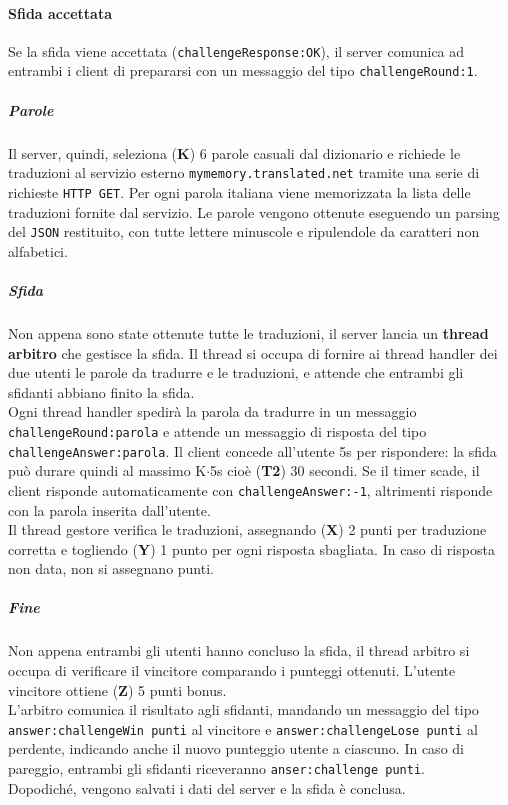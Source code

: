 \documentclass[10pt]{article}
\begin{document}
{\paragraph{Sfida accettata} Se la sfida viene accettata (\texttt{challengeResponse:OK}), il server comunica ad entrambi i client di prepararsi con un messaggio del tipo \texttt{challengeRound:1}.
\subparagraph{Parole} Il server, quindi, seleziona (\textbf{K}) 6 parole casuali dal dizionario e richiede le traduzioni al servizio esterno \texttt{mymemory.translated.net} tramite una serie di richieste \texttt{HTTP GET}. Per ogni parola italiana viene memorizzata la lista delle traduzioni fornite dal servizio. Le parole vengono ottenute eseguendo un parsing del \texttt{JSON} restituito, con tutte lettere minuscole e ripulendole da caratteri non alfabetici.
\subparagraph{Sfida} Non appena sono state ottenute tutte le traduzioni, il server lancia un \textbf{thread arbitro} che gestisce la sfida. Il thread si occupa di fornire ai thread handler dei due utenti le parole da tradurre e le traduzioni, e attende che entrambi gli sfidanti abbiano finito la sfida.\\
Ogni thread handler spedirà la parola da tradurre in un messaggio \texttt{challengeRound:parola} e attende un messaggio di risposta del tipo \texttt{challengeAnswer:parola}. Il client concede all'utente 5s per rispondere: la sfida può durare quindi al massimo K$\cdot$5s cioè (\textbf{T2}) 30 secondi. Se il timer scade, il client risponde automaticamente con \texttt{challengeAnswer:-1}, altrimenti risponde con la parola inserita dall'utente.\\
Il thread gestore verifica le traduzioni, assegnando (\textbf{X}) 2 punti per traduzione corretta e togliendo (\textbf{Y}) 1 punto per ogni risposta sbagliata. In caso di risposta non data, non si assegnano punti.
\subparagraph{Fine} Non appena entrambi gli utenti hanno concluso la sfida, il thread arbitro si occupa di verificare il vincitore comparando i punteggi ottenuti. L'utente vincitore ottiene (\textbf{Z}) 5 punti bonus.\\
L'arbitro comunica il risultato agli sfidanti, mandando un messaggio del tipo \texttt{answer:challengeWin punti} al vincitore e \texttt{answer:challengeLose punti} al perdente, indicando anche il nuovo punteggio utente a ciascuno. In caso di pareggio, entrambi gli sfidanti riceveranno \texttt{anser:challenge punti}.\\
Dopodiché, vengono salvati i dati del server e la sfida è conclusa.
}
\end{document}
